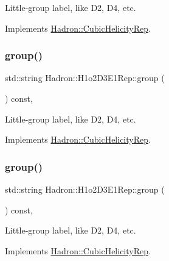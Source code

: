 Little-\/group label, like D2, D4, etc. 

Implements \mbox{\hyperlink{structHadron_1_1CubicHelicityRep_a101a7d76cd8ccdad0f272db44b766113}{Hadron\+::\+Cubic\+Helicity\+Rep}}.

\mbox{\label{structHadron_1_1H1o2D3E1Rep_a6c9218517ca2797e0d5ee7e92887a916}} 
\subsubsection{\texorpdfstring{group()}{group()}\hspace{0.1cm}{\footnotesize\ttfamily [2/3]}}
{\footnotesize\ttfamily std\+::string Hadron\+::\+H1o2\+D3\+E1\+Rep\+::group (\begin{DoxyParamCaption}{ }\end{DoxyParamCaption}) const\hspace{0.3cm}{\ttfamily [inline]}, {\ttfamily [virtual]}}

Little-\/group label, like D2, D4, etc. 

Implements \mbox{\hyperlink{structHadron_1_1CubicHelicityRep_a101a7d76cd8ccdad0f272db44b766113}{Hadron\+::\+Cubic\+Helicity\+Rep}}.

\mbox{\label{structHadron_1_1H1o2D3E1Rep_a6c9218517ca2797e0d5ee7e92887a916}} 
\subsubsection{\texorpdfstring{group()}{group()}\hspace{0.1cm}{\footnotesize\ttfamily [3/3]}}
{\footnotesize\ttfamily std\+::string Hadron\+::\+H1o2\+D3\+E1\+Rep\+::group (\begin{DoxyParamCaption}{ }\end{DoxyParamCaption}) const\hspace{0.3cm}{\ttfamily [inline]}, {\ttfamily [virtual]}}

Little-\/group label, like D2, D4, etc. 

Implements \mbox{\hyperlink{structHadron_1_1CubicHelicityRep_a101a7d76cd8ccdad0f272db44b766113}{Hadron\+::\+Cubic\+Helicity\+Rep}}.

